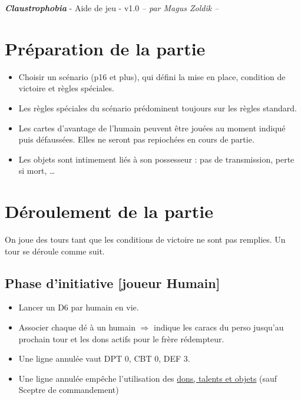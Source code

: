\documentclass[10pt, a4paper]{article}	%
\begin{document}
{\LARGE \textbf{\textit{Claustrophobia}}}
{\large - Aide de jeu - v1.0}\textit{ -- par Magus Zoldik --}

\setlength{\columnseprule}{0.002cm}	%
\begin{multicols}{3}				%

\section{Préparation de la partie}

\begin{itemize}
\item Choisir un scénario (p16 et plus), qui défini la mise en place, condition de victoire et règles spéciales.
\item Les règles spéciales du scénario prédominent toujours sur les règles standard.
\item Les cartes d'avantage de l'humain peuvent être jouées au moment indiqué puis défaussées. Elles ne seront pas repiochées en cours de partie.
\item Les objets sont intimement liés à son possesseur : pas de transmission, perte si mort, \dots
\end{itemize}



\section{Déroulement de la partie}

On joue des tours tant que les conditions de victoire ne sont pas remplies. Un tour se déroule comme suit.

\subsection{Phase d'initiative [joueur Humain]}
\begin{itemize}
\item Lancer un D6 par humain en vie.
\item Associer chaque dé à un humain $\Rightarrow$ indique les caracs du perso jusqu'au prochain tour et les dons actifs pour le frère rédempteur.
\item Une ligne annulée vaut DPT 0, CBT 0, DEF 3.
\item Une ligne annulée empêche l'utilisation des \underline{dons, talents et objets} (sauf \og Sceptre de commandement\fg)
\end{itemize}



\end{multicols}
\end{document}
